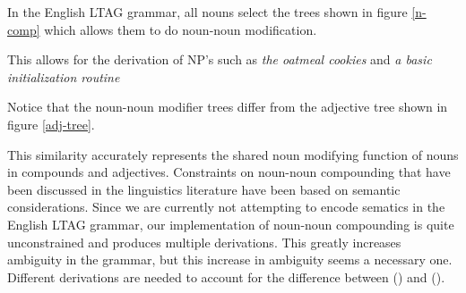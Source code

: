 In the English LTAG grammar, all nouns select the trees shown in
figure \ref{n-comp} which allows them to do noun-noun modification.

\begin{figure}[h]
\end{figure}

This allows for the derivation of NP's such as {\it the oatmeal cookies}
and {\it a basic initialization routine}

\begin{figure}[h]
\end{figure}

Notice that the noun-noun modifier trees differ from the adjective
tree shown in figure \ref{adj-tree}.

\begin{figure}
\end{figure}

This similarity accurately represents the shared noun modifying
function of nouns in compounds and adjectives.  Constraints on
noun-noun compounding that have been discussed in the linguistics
literature have been based on semantic considerations. Since we are
currently not attempting to encode sematics in the English LTAG
grammar, our implementation of noun-noun compounding is quite
unconstrained and produces multiple derivations. This greatly
increases ambiguity in the grammar, but this increase in ambiguity
seems a necessary one.  Different derivations are needed to account
for the difference between () and ().








